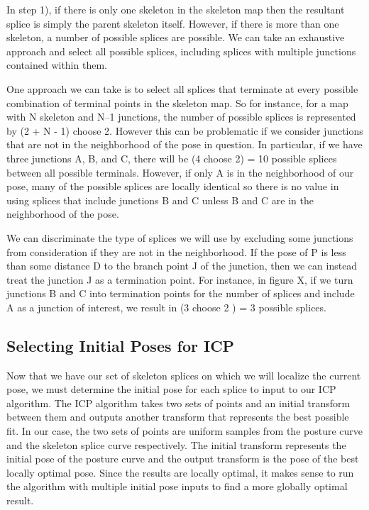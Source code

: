 In step 1), if there is only one skeleton in the skeleton map then the resultant splice is simply the parent skeleton itself. However, if there is more than one skeleton, a number of possible splices are possible. We can take an exhaustive approach and select all possible splices, including splices with multiple junctions contained within them.

One approach we can take is to select all splices that terminate at every possible combination of terminal points in the skeleton map. So for instance, for a map with N skeleton and N--1 junctions, the number of possible splices is represented by (2 + N - 1) choose 2. However this can be problematic if we consider junctions that are not in the neighborhood of the pose in question. In particular, if we have three junctions A, B, and C, there will be (4 choose 2) = 10 possible splices between all possible terminals. However, if only A is in the neighborhood of our pose, many of the possible splices are locally identical so there is no value in using splices that include junctions B and C unless B and C are in the neighborhood of the pose.

We can discriminate the type of splices we will use by excluding some junctions from consideration if they are not in the neighborhood. If the pose of P is less than some distance D to the branch point J of the junction, then we can instead treat the junction J as a termination point. For instance, in figure X, if we turn junctions B and C into termination points for the number of splices and include A as a junction of interest, we result in (3 choose 2 ) = 3 possible splices.

\subsection{Selecting Initial Poses for ICP}
\label{selectinginitialposesforicp}

Now that we have our set of skeleton splices on which we will localize the current pose, we must determine the initial pose for each splice to input to our ICP algorithm. The ICP algorithm takes two sets of points and an initial transform between them and outputs another transform that represents the best possible fit. In our case, the two sets of points are uniform samples from the posture curve and the skeleton splice curve respectively. The initial transform represents the initial pose of the posture curve and the output transform is the pose of the best locally optimal pose. Since the results are locally optimal, it makes sense to run the algorithm with multiple initial pose inputs to find a more globally optimal result.

